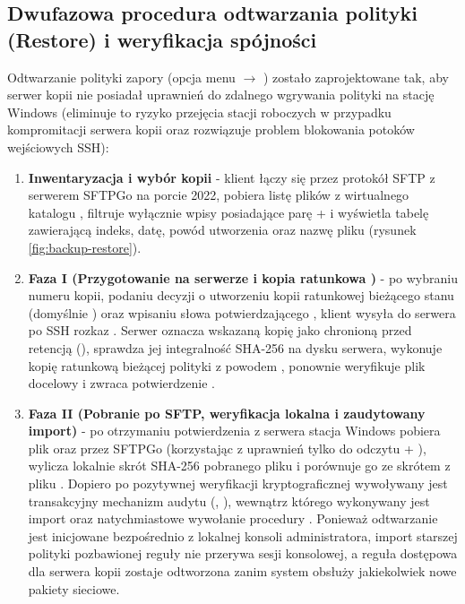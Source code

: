 \subsection{Dwufazowa procedura odtwarzania polityki (Restore) i weryfikacja spójności}\label{subsec:import-konfiguracji}

Odtwarzanie polityki zapory (opcja menu  $\rightarrow$ \code{[R]}) zostało zaprojektowane tak, aby serwer kopii nie posiadał uprawnień do zdalnego wgrywania polityki na stację Windows (eliminuje to ryzyko przejęcia stacji roboczych w przypadku kompromitacji serwera kopii oraz rozwiązuje problem blokowania potoków wejściowych SSH):

\begin{enumerate}
    \item \textbf{Inwentaryzacja i wybór kopii} - klient łączy się przez protokół SFTP z serwerem SFTPGo na porcie 2022, pobiera listę plików z wirtualnego katalogu , filtruje wyłącznie wpisy posiadające parę  +  i wyświetla tabelę zawierającą indeks, datę, powód utworzenia oraz nazwę pliku (rysunek \ref{fig:backup-restore}).
    \item \textbf{Faza I (Przygotowanie na serwerze i kopia ratunkowa )} - po wybraniu numeru kopii, podaniu decyzji o utworzeniu kopii ratunkowej bieżącego stanu (domyślnie ) oraz wpisaniu słowa potwierdzającego , klient wysyła do serwera po SSH rozkaz . Serwer oznacza wskazaną kopię jako chronioną przed retencją (), sprawdza jej integralność SHA-256 na dysku serwera, wykonuje kopię ratunkową bieżącej polityki z powodem , ponownie weryfikuje plik docelowy i zwraca potwierdzenie .
    \item \textbf{Faza II (Pobranie po SFTP, weryfikacja lokalna i zaudytowany import)} - po otrzymaniu potwierdzenia z serwera stacja Windows pobiera plik  oraz  przez SFTPGo (korzystając z uprawnień tylko do odczytu  + ), wylicza lokalnie skrót SHA-256 pobranego pliku i porównuje go ze skrótem z pliku . Dopiero po pozytywnej weryfikacji kryptograficznej wywoływany jest transakcyjny mechanizm audytu (, ), wewnątrz którego wykonywany jest import  oraz natychmiastowe wywołanie procedury . Ponieważ odtwarzanie jest inicjowane bezpośrednio z lokalnej konsoli administratora, import starszej polityki pozbawionej reguły  nie przerywa sesji konsolowej, a reguła dostępowa dla serwera kopii zostaje odtworzona zanim system obsłuży jakiekolwiek nowe pakiety sieciowe.
\end{enumerate}

